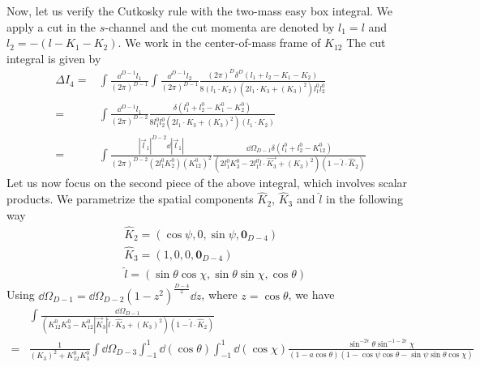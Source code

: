 Now, let us verify the Cutkosky rule with the two-mass easy box integral.
We apply a cut in the $s$-channel and the cut momenta are denoted by $l_1 = l$ and $l_2 = -( l-K_1-K_2)$.
We work in the center-of-mass frame of $K_{12}$
The cut integral is given by
\begin{equation}\label{cuti4}
\begin{split}
\Delta I_4 =&
\int\frac{\dd^{D-1}l_1}{(2\pi)^{D-1}} 
 \int\frac{\dd^{D-1}l_2}{(2\pi)^{D-1}}
\frac{(2\pi)^D\delta^{D}(l_1 + l_2 - K_1- K_2)}{8(l_1\cdot K_2)(2l_1\cdot K_3 + (K_3)^2)l_1^0 l_2^0} 
\\
 = & 
\int\frac{\dd^{D-1}l_1}{(2\pi)^{D-2}} 
\frac{\delta(l_1^0 + l_2^0 - K_1^0 - K_2^0)}{8 l_1^0 l_2^0 (2l_1\cdot K_3 + (K_3)^2)(l_1\cdot K_2)}
\\
 = & \int\frac{|\vec{l}_1|^{D-2} \dd |\vec{l}_1|}{(2\pi)^{D-2}(2l_1^0 K_2^0)(K_{12}^0)^2}
\frac{\dd \Omega_{D-1} \delta(l_1^0 + l_2^0 - K^0_{12})}{(2l_1^0 K_3^0 - 2l_1^0 \hat{l}\cdot\vec{K_3} + (K_3)^2)(1-\hat{l}\cdot \hat{K}_2)}
\end{split}
\end{equation}
Let us now focus on the second piece of the above integral, which involves scalar products. 
We parametrize the spatial components $\hat{K}_2$, $\hat{K}_3$ and $\hat{l}$ in the following way
\begin{equation*}
\begin{split}
& \hat{K}_2 = (\cos\psi, 0, \sin \psi, \mathbf{0}_{D-4})
\\
& \hat{K}_3 = (1,0,0,\mathbf{0}_{D-4})
\\
& \hat{l} = (\sin\theta\cos\chi, \sin\theta\sin\chi,\cos\theta)
\end{split}
\end{equation*}
Using $\dd\Omega_{D-1} = \dd \Omega_{D-2}(1-z^2)^{\frac{D-4}{2}}\dd z$, where $z = \cos\theta$, 
we have
\begin{equation}\label{omega11}
\begin{split}
& \int\frac{\dd \Omega_{D-1}}{(K_{12}^0 K_3^0 - K_{12}^0 |\vec{K}_3| \hat{l}\cdot \hat{K}_3 + (K_3)^2)(1-\hat{l}\cdot\hat{K}_2)}
\\
= & \frac{1}{(K_3)^2 + K_{12}^0 K_3^0}\int \dd \Omega_{D-3}
\int_{-1}^1 \dd(\cos\theta)\int_{-1}^1\dd(\cos \chi)\frac{\sin^{-2\epsilon}\theta \sin^{-1-2\epsilon}\chi}{(1-a\cos\theta)(1-\cos\psi\cos\theta  - \sin\psi\sin\theta\cos\chi)}
\end{split}
\end{equation}
